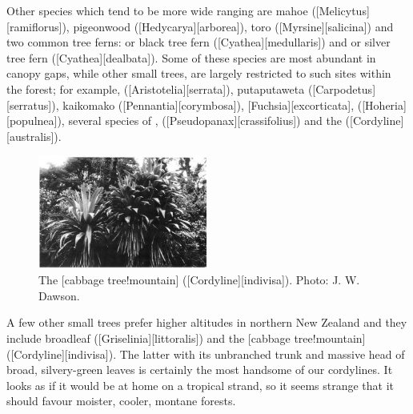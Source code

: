 Other species which tend to be more wide ranging are mahoe ([Melicytus][ramiflorus]), pigeonwood ([Hedycarya][arborea]), toro ([Myrsine][salicina]) and two common tree ferns:  or black tree fern ([Cyathea][medullaris]) and  or silver tree fern ([Cyathea][dealbata]).
Some of these species are most abundant in canopy gaps, while other small trees, are largely restricted to such sites within the forest; for example,  ([Aristotelia][serrata]), putaputaweta ([Carpodetus][serratus]), kaikomako ([Pennantia][corymbosa]), [Fuchsia][excorticata],  ([Hoheria][populnea]), several species of ,  ([Pseudopanax][crassifolius]) and the  ([Cordyline][australis]).

\begin{figure}
	\includegraphics[width=0.5\textwidth]{graphics/figure61cabbagetree.jpg}
	\centering
	\caption[The mountain cabbage tree]{The [cabbage tree!mountain] ([Cordyline][indivisa]).
	Photo: J. W. Dawson.}%
	\label{fig:61cabbagetree}
\end{figure}

A few other small trees prefer higher altitudes in northern New Zealand and they include broadleaf ([Griselinia][littoralis]) and the [cabbage tree!mountain] ([Cordyline][indivisa]).
The latter with its unbranched trunk and massive head of broad, silvery-green leaves is certainly the most handsome of our cordylines.
It looks as if it would be at home on a tropical strand, so it seems strange that it should favour moister, cooler, montane forests.

